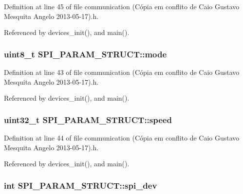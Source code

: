 Definition at line 45 of file communication (\-Cópia em conflito de Caio Gustavo Mesquita Angelo 2013-\/05-\/17).\-h.



Referenced by devices\-\_\-init(), and main().

\hypertarget{structSPI__PARAM__STRUCT_a82c546c99f6c3daed73c1e23426be847}{
\subsubsection[{mode}]{\setlength{\rightskip}{0pt plus 5cm}uint8\-\_\-t S\-P\-I\-\_\-\-P\-A\-R\-A\-M\-\_\-\-S\-T\-R\-U\-C\-T\-::mode}}\label{structSPI__PARAM__STRUCT_a82c546c99f6c3daed73c1e23426be847}


Definition at line 43 of file communication (\-Cópia em conflito de Caio Gustavo Mesquita Angelo 2013-\/05-\/17).\-h.



Referenced by devices\-\_\-init(), and main().

\hypertarget{structSPI__PARAM__STRUCT_a53a8d386594a81eb9bc6f971bfe36c54}{
\subsubsection[{speed}]{\setlength{\rightskip}{0pt plus 5cm}uint32\-\_\-t S\-P\-I\-\_\-\-P\-A\-R\-A\-M\-\_\-\-S\-T\-R\-U\-C\-T\-::speed}}\label{structSPI__PARAM__STRUCT_a53a8d386594a81eb9bc6f971bfe36c54}


Definition at line 44 of file communication (\-Cópia em conflito de Caio Gustavo Mesquita Angelo 2013-\/05-\/17).\-h.



Referenced by devices\-\_\-init(), and main().

\hypertarget{structSPI__PARAM__STRUCT_abe385c44333d268d17cf648c8e371cad}{
\subsubsection[{spi\-\_\-dev}]{\setlength{\rightskip}{0pt plus 5cm}int S\-P\-I\-\_\-\-P\-A\-R\-A\-M\-\_\-\-S\-T\-R\-U\-C\-T\-::spi\-\_\-dev}}\label{structSPI__PARAM__STRUCT_abe385c44333d268d17cf648c8e371cad}



